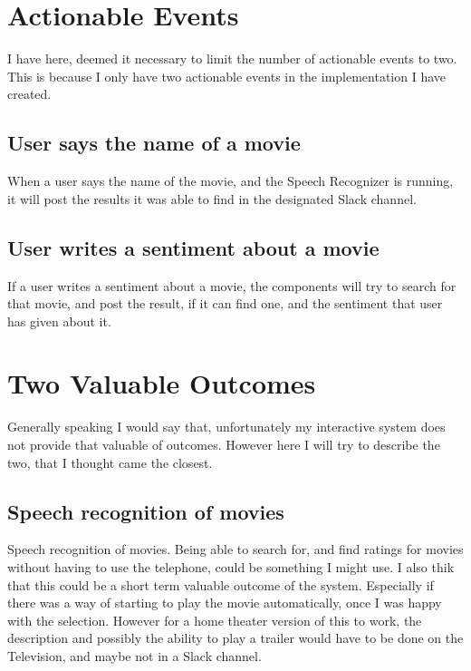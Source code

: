 \documentclass[11pt,fleqn]{book} %
\begin{document}
\chapter{Actionable Events}
I have here, deemed it necessary to limit the number of actionable events to two. This is because I only have two actionable events in the implementation I have created.
\section{User says the name of a movie}
When a user says the name of the movie, and the Speech Recognizer is running, it will post the results it was able to find in the designated Slack channel.

\section{User writes a sentiment about a movie}
If a user writes a sentiment about a movie, the components will try to search for that movie, and post the result, if it can find one, and the sentiment that user has given about it.



\chapter{Two Valuable Outcomes}
Generally speaking I would say that, unfortunately my interactive system does not provide that valuable of outcomes.
However here I will try to describe the two, that I thought came the closest.

\section{Speech recognition of movies}
Speech recognition of movies. Being able to search for, and find ratings for movies without having to use the telephone, could be something I might use.
I also thik that this could be a short term valuable outcome of the system. Especially if there was a way of starting to play the movie automatically, once I was happy with the selection. However for a home theater version of this to work, the description and possibly the ability to play a trailer would have to be done on the Television, and maybe not in a Slack channel.
\end{document}
